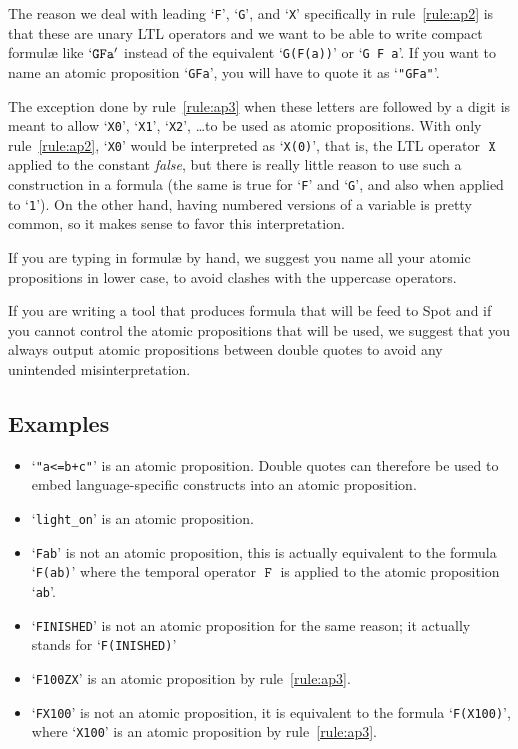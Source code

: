 \documentclass[a4paper,twoside,10pt,DIV=12,draft]{scrreprt}
\DeclareMathOperator{\F}{\texttt{F}}
\DeclareMathOperator{\X}{\texttt{X}}
\newcommand{\0}{\texttt{0}}
\newcommand{\1}{\texttt{1}}
\newcommand\samp[1]{`\texttt{#1}'}
\begin{document}
The reason we deal with leading \samp{F}, \samp{G}, and \samp{X}
specifically in rule~\ref{rule:ap2} is that these are unary LTL
operators and we want to be able to write compact formul\ae{} like
$\samp{GFa}$ instead of the equivalent \samp{G(F(a))} or
\samp{G~F~a}.  If you want to name an atomic proposition \samp{GFa},
you will have to quote it as \samp{"GFa"}.

The exception done by rule~\ref{rule:ap3} when these letters are
followed by a digit is meant to allow \samp{X0}, \samp{X1}, \samp{X2},
\dots to be used as atomic propositions.  With only
rule~\ref{rule:ap2}, \samp{X0} would be interpreted as \samp{X(0)},
that is, the LTL operator $\X$ applied to the constant \textit{false},
but there is really little reason to use such a construction in a
formula (the same is true for \samp{F} and \samp{G}, and also when
applied to \samp{1}).  On the other hand, having numbered versions of
a variable is pretty common, so it makes sense to favor this
interpretation.

If you are typing in formul\ae{} by hand, we suggest you name all your
atomic propositions in lower case, to avoid clashes with the uppercase
operators.

If you are writing a tool that produces formula that will be feed to
Spot and if you cannot control the atomic propositions that will be
used, we suggest that you always output atomic propositions between
double quotes to avoid any unintended misinterpretation.


\subsection{Examples}

\begin{itemize}
\item \samp{"a<=b+c"} is an atomic proposition.  Double quotes can
  therefore be used to embed language-specific constructs into an
  atomic proposition.
\item \samp{light\_on} is an atomic proposition.
\item \samp{Fab} is not an atomic proposition, this is actually
  equivalent to the formula \samp{F(ab)} where the temporal operator
  $\F$ is applied to the atomic proposition \samp{ab}.
\item \samp{FINISHED} is not an atomic proposition for the same
  reason; it actually stands for \samp{F(INISHED)}
\item \samp{F100ZX} is an atomic proposition by rule~\ref{rule:ap3}.
\item \samp{FX100} is not an atomic proposition, it is equivalent to the
  formula \samp{F(X100)}, where \samp{X100} is an atomic proposition
  by rule~\ref{rule:ap3}.
\end{itemize}
\end{document}

